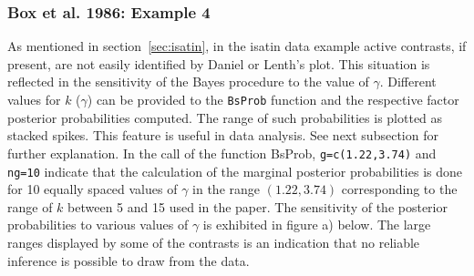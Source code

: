\documentclass[letterpaper]{article}
\begin{document}
\subsubsection{Box et al. 1986: Example 4}

As mentioned in section~\ref{sec:isatin}, in the isatin data example active
contrasts, if present, are not easily identified by Daniel or Lenth's plot.
This situation is reflected in the sensitivity of the Bayes procedure to the
value of $\gamma$. Different values for $k$ ($\gamma$) can be provided to the
\texttt{BsProb} function and the respective factor posterior probabilities
computed. The range of such probabilities is plotted as stacked spikes. This
feature is useful in data analysis. See next subsection for further
explanation. In the call of the function \textsf{BsProb},
\texttt{g=c(1.22,3.74)} and \texttt{ng=10} indicate that the calculation of
the marginal posterior probabilities is done for 10 equally spaced values of
$\gamma$ in the range $(1.22, 3.74)$ corresponding to the range of $k$
between 5 and 15 used in the paper. The sensitivity of the posterior
probabilities to various values of $\gamma$ is exhibited in figure a) below.
The large ranges displayed by some of the contrasts is an indication that no
reliable inference is possible to draw from the data.
\end{document}
